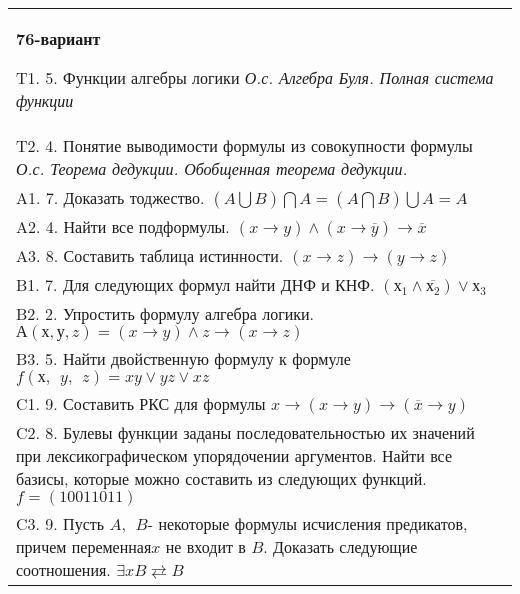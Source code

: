 \documentclass{article}
\begin{document}
\begin{tabular}{m{17cm}}
\textbf{76-вариант}
\newline

T1. 5. Функции алгебры логики \emph{О.с. Алгебра Буля. Полная система функции} \\
T2. 4. Понятие выводимости формулы из совокупности формулы \emph{О.с. Теорема дедукции. Обобщенная теорема дедукции.} \\
A1. 7. Доказать тоджество. \((A\bigcup B)\bigcap A = (A\bigcap B)\bigcup A = A\) \\
A2. 4. Найти все подформулы. \((x \rightarrow y) \land (x \rightarrow \overline{y}) \rightarrow \overline{x}\) \\
A3. 8. Составить таблица истинности. \((x \rightarrow z) \rightarrow (y \rightarrow z)\) \\
B1. 7. Для следующих формул найти ДНФ и КНФ. \(\left( х_{1} \land \overline{х_{2}} \right) \vee х_{3}\) \\
B2. 2. Упростить формулу алгебра логики. \(А(х,у,z) = (x \rightarrow y) \land z \rightarrow (x \rightarrow z)\) \\
B3. 5. Найти двойственную формулу к формуле \(f(х,\ \ y,\ \ z) = xy \vee yz \vee xz\) \\
C1. 9. Составить РКС для формулы \(x \rightarrow (x \rightarrow y) \rightarrow (\overline{x} \rightarrow y)\ \) \\
C2. 8. Булевы функции заданы последовательностью их значений при лексикографическом упорядочении аргументов. Найти все базисы, которые можно составить из следующих функций. \(f = (10011011)\) \\
C3. 9. Пусть \(A,\ \ B\)- некоторые формулы исчисления предикатов, причем переменная\(x\) не входит в \(B\). Доказать следующие соотношения. \(\exists xB \rightleftarrows B\)
 \\

\end{tabular}
\vspace{1cm}
\end{document}
